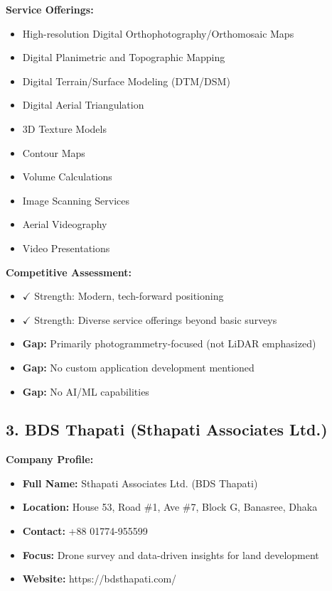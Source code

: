 \textbf{Service Offerings:}
\begin{itemize}
    \item High-resolution Digital Orthophotography/Orthomosaic Maps
    \item Digital Planimetric and Topographic Mapping
    \item Digital Terrain/Surface Modeling (DTM/DSM)
    \item Digital Aerial Triangulation
    \item 3D Texture Models
    \item Contour Maps
    \item Volume Calculations
    \item Image Scanning Services
    \item Aerial Videography
    \item Video Presentations
\end{itemize}

\textbf{Competitive Assessment:}
\begin{itemize}
    \item \textcolor{AccentGreen}{$\checkmark$ Strength:} Modern, tech-forward positioning
    \item \textcolor{AccentGreen}{$\checkmark$ Strength:} Diverse service offerings beyond basic surveys
    \item \textbf{Gap:} Primarily photogrammetry-focused (not LiDAR emphasized)
    \item \textbf{Gap:} No custom application development mentioned
    \item \textbf{Gap:} No AI/ML capabilities
\end{itemize}

\subsection{3. BDS Thapati (Sthapati Associates Ltd.)}

\textbf{Company Profile:}
\begin{itemize}
    \item \textbf{Full Name:} Sthapati Associates Ltd. (BDS Thapati)
    \item \textbf{Location:} House 53, Road \#1, Ave \#7, Block G, Banasree, Dhaka
    \item \textbf{Contact:} +88 01774-955599
    \item \textbf{Focus:} Drone survey and data-driven insights for land development
    \item \textbf{Website:} https://bdsthapati.com/
\end{itemize}

